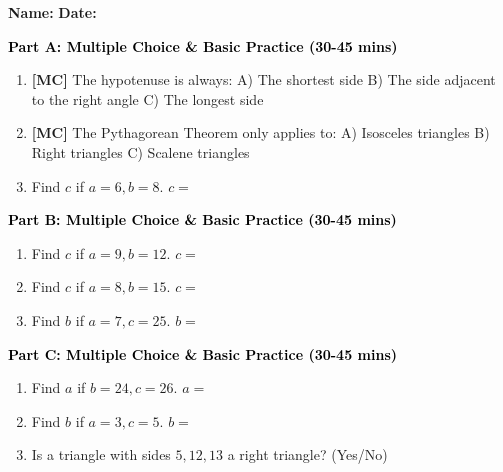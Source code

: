 \documentclass[12pt, letterpaper, fleqn]{article}
\newcommand{\blank}{\underline{\hspace{2.2cm}}}
\begin{document}
\textbf{Name:} \underline{\hspace{5cm}}
\hfill
\textbf{Date:} \underline{\hspace{3cm}}\\


\begin{tcolorbox}[colback=customteal!20]
\large\textcolor{black}{\textbf{Part A: Multiple Choice \& Basic Practice (30-45 mins)}}
\end{tcolorbox}

\vspace{3mm}

\begin{enumerate}[itemsep=2.5cm, leftmargin=0.6cm]
\item \textbf{[MC]} The hypotenuse is always:
A) The shortest side B) The side adjacent to the right angle C) The longest side
\item \textbf{[MC]} The Pythagorean Theorem only applies to:
A) Isosceles triangles B) Right triangles C) Scalene triangles
\item Find $c$ if $a=6, b=8$. $c=$ \blank
\end{enumerate}

\newpage

\begin{tcolorbox}[colback=customteal!20]
\large\textcolor{black}{\textbf{Part B: Multiple Choice \& Basic Practice (30-45 mins)}}
\end{tcolorbox}

\vspace{3mm}

\begin{enumerate}[itemsep=2.5cm, leftmargin=0.6cm, resume]
\item Find $c$ if $a=9, b=12$. $c=$ \blank
\item Find $c$ if $a=8, b=15$. $c=$ \blank
\item Find $b$ if $a=7, c=25$. $b=$ \blank
\end{enumerate}

\newpage

\begin{tcolorbox}[colback=customteal!20]
\large\textcolor{black}{\textbf{Part C: Multiple Choice \& Basic Practice (30-45 mins)}}
\end{tcolorbox}

\vspace{3mm}

\begin{enumerate}[itemsep=2.5cm, leftmargin=0.6cm, resume]
\item Find $a$ if $b=24, c=26$. $a=$ \blank
\item Find $b$ if $a=3, c=5$. $b=$ \blank
\item Is a triangle with sides $5, 12, 13$ a right triangle? (Yes/No) \blank
\end{enumerate}
\end{document}
